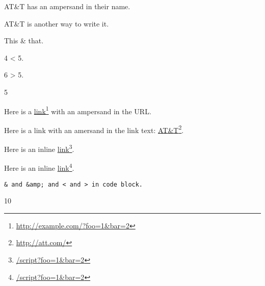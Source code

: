 
\def\mytitle{Amps and Angles}


AT\&T has an ampersand in their name.

AT\&T is another way to write it.

This \& that.

4 < 5.

6 > 5.

5

Here is a \href{http://example.com/?foo=1&bar=2}{link}\footnote{\href{http://example.com/?foo=1&bar=2}{http:\slash \slash example.com\slash ?foo=1\&bar=2}} with an ampersand in the URL.

Here is a link with an amersand in the link text: \href{http://att.com/}{AT\&T}\footnote{\href{http://att.com/}{http:\slash \slash att.com\slash }}.

Here is an inline \href{/script?foo=1&bar=2}{link}\footnote{\href{/script?foo=1&bar=2}{\slash script?foo=1\&bar=2}}.

Here is an inline \href{/script?foo=1&bar=2}{link}\footnote{\href{/script?foo=1&bar=2}{\slash script?foo=1\&bar=2}}.

\begin{verbatim}
& and &amp; and < and > in code block.
\end{verbatim}

10



